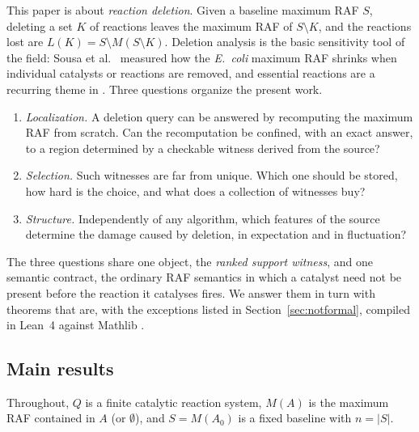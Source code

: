 \documentclass[11pt,a4paper]{article}
\theoremstyle{plain}
\theoremstyle{definition}
\theoremstyle{remark}
\begin{document}
This paper is about \emph{reaction deletion}. Given a baseline maximum RAF $S$, deleting a set $K$ of reactions leaves the maximum RAF of $S\setminus K$, and the reactions lost are $L(K)=S\setminus M(S\setminus K)$. Deletion analysis is the basic sensitivity tool of the field: Sousa et al.\ \citep{sousa2015} measured how the \emph{E.~coli} maximum RAF shrinks when individual catalysts or reactions are removed, and essential reactions are a recurring theme in \citep{steel2020,huson2024}. Three questions organize the present work.
\begin{enumerate}[label=(\roman*)]
\item \emph{Localization.} A deletion query can be answered by recomputing the maximum RAF from scratch. Can the recomputation be confined, with an exact answer, to a region determined by a checkable witness derived from the source?
\item \emph{Selection.} Such witnesses are far from unique. Which one should be stored, how hard is the choice, and what does a collection of witnesses buy?
\item \emph{Structure.} Independently of any algorithm, which features of the source determine the damage caused by deletion, in expectation and in fluctuation?
\end{enumerate}
The three questions share one object, the \emph{ranked support witness}, and one semantic contract, the ordinary RAF semantics in which a catalyst need not be present before the reaction it catalyses fires. We answer them in turn with theorems that are, with the exceptions listed in Section~\ref{sec:notformal}, compiled in Lean~4 \citep{demoura2021} against Mathlib \citep{mathlib2020}.

\subsection{Main results}\label{sec:mainresults}

Throughout, $Q$ is a finite catalytic reaction system, $M(A)$ is the maximum RAF contained in $A$ (or $\emptyset$), and $S=M(A_0)$ is a fixed baseline with $n=|S|$.
\end{document}
